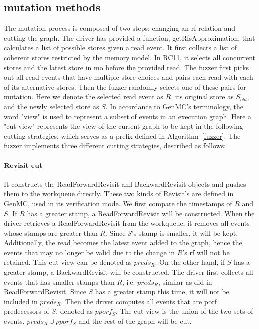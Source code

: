 \subsection{mutation methods}

The mutation process is composed of two steps: changing an rf relation and cutting the graph. The driver has provided a function, getRfsApproximation, that calculates a list of possible stores given a read event. It first collects a list of coherent stores restricted by the memory model. In RC11, it selects all concurrent stores and the latest store in mo before the provided read. The fuzzer first picks out all read events that have multiple store choices and pairs each read with each of its alternative stores. Then the fuzzer randomly selects one of these pairs for mutation. Here we denote the selected read event as $R$, its original store as $S_{old}$, and the newly selected store as $S$. In accordance to GenMC's terminology, the word "view" is used to represent a subset of events in an execution graph. Here a "cut view" represents the view of the current graph to be kept in the following cutting strategies, which serves as a prefix defined in Algorithm~\ref{fuzzer}. The fuzzer implements three different cutting strategies, described as follows:

\paragraph{Revisit cut} It constructs the ReadForwardRevisit and BackwardRevisit objects and pushes them to the workqueue directly. These two kinds of Revisit's are defined in GenMC, used in its verification mode. We first compare the timestamps of $R$ and $S$. If $R$ has a greater stamp, a ReadForwardRevisit will be constructed. When the driver retrieves a ReadForwardRevisit from the workqueue, it removes all events whose stamps are greater than $R$. Since $S$'s stamp is smaller, it will be kept. Additionally, the read becomes the latest event added to the graph, hence the events that may no longer be valid due to the change in $R$'s rf will not be retained. This cut view can be denoted as $preds_{R}$. On the other hand, if $S$ has a greater stamp, a BackwardRevisit will be constructed. The driver first collects all events that has smaller stamps than $R$, i.e. $preds_{R}$, similar as did in ReadForwardRevisit. Since $S$ has a greater stamp this time, it will not be included in $preds_{R}$. Then the driver computes all events that are porf predecessors of $S$, denoted as $pporf_{S}$. The cut view is the union of the two sets of events, $preds_{R} \cup pporf_{S}$ and the rest of the graph will be cut.

